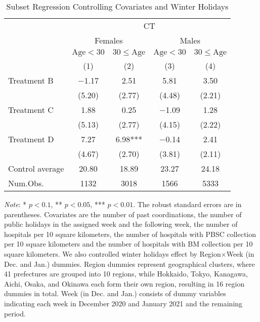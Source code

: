 \documentclass[12pt, a4paper]{article}
\begin{document}
\begin{table}[H]

\caption{\label{tab:test-lm-subset3}Subset Regression Controlling Covariates and Winter Holidays}
\centering
\fontsize{8}{10}\selectfont
\begin{threeparttable}
\begin{tabular}[t]{lcccc}
\toprule
\multicolumn{1}{c}{ } & \multicolumn{4}{c}{CT} \\
\cmidrule(l{3pt}r{3pt}){2-5}
\multicolumn{1}{c}{ } & \multicolumn{2}{c}{Females} & \multicolumn{2}{c}{Males} \\
\cmidrule(l{3pt}r{3pt}){2-3} \cmidrule(l{3pt}r{3pt}){4-5}
\multicolumn{1}{c}{ } & \multicolumn{1}{c}{$\text{Age} < 30$} & \multicolumn{1}{c}{$30 \le \text{Age}$} & \multicolumn{1}{c}{$\text{Age} < 30$} & \multicolumn{1}{c}{$30 \le \text{Age}$} \\
\cmidrule(l{3pt}r{3pt}){2-2} \cmidrule(l{3pt}r{3pt}){3-3} \cmidrule(l{3pt}r{3pt}){4-4} \cmidrule(l{3pt}r{3pt}){5-5}
  & (1) & (2) & (3) & (4)\\
\midrule
Treatment B & \num{-1.17} & \num{2.51} & \num{5.81} & \num{3.50}\\
 & (\num{5.20}) & (\num{2.77}) & (\num{4.48}) & (\num{2.21})\\
Treatment C & \num{1.88} & \num{0.25} & \num{-1.09} & \num{1.28}\\
 & (\num{5.13}) & (\num{2.77}) & (\num{4.15}) & (\num{2.22})\\
Treatment D & \num{7.27} & \num{6.98}*** & \num{-0.14} & \num{2.41}\\
 & (\num{4.67}) & (\num{2.70}) & (\num{3.81}) & (\num{2.11})\\
\midrule
Control average & 20.80 & 18.89 & 23.27 & 24.18\\
Num.Obs. & \num{1132} & \num{3018} & \num{1566} & \num{5333}\\
\bottomrule
\end{tabular}
\begin{tablenotes}
\item \emph{Note}: * $p < 0.1$, ** $p < 0.05$, *** $p < 0.01$. The robust standard errors are in parentheses. Covariates are the number of past coordinations, the number of public holidays in the assigned week and the following week, the number of hospitals per 10 square kilometers, the number of hospitals with PBSC collection per 10 square kilometers and the number of hospitals with BM collection per 10 square kilometers. We also controlled winter holidays effect by Region$\times$Week (in Dec. and Jan.) dummies. Region dummies represent geographical clusters, where 41 prefectures are grouped into 10 regions, while Hokkaido, Tokyo, Kanagawa, Aichi, Osaka, and Okinawa each form their own region, resulting in 16 region dummies in total. Week (in Dec. and Jan.) consists of dummy variables indicating each week in December 2020 and January 2021 and the remaining period.
\end{tablenotes}
\end{threeparttable}
\end{table}
\end{document}
